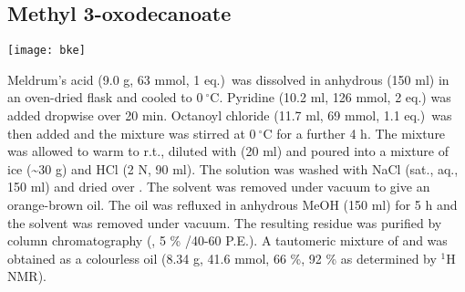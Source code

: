 \newpage

\subsection{Methyl 3-oxodecanoate }

\begin{scheme}[H]
	\begin{center}
		\texttt{[image: bke]}
	\end{center}
\end{scheme}

Meldrum's acid  (9.0 g, 63 mmol, 1 eq.)\ was dissolved in anhydrous  (150 ml) in an oven-dried flask and cooled to $0\ ^{\circ}$C. Pyridine (10.2 ml, 126 mmol, 2 eq.) was added dropwise over 20 min. Octanoyl chloride  (11.7 ml, 69 mmol, 1.1 eq.)\ was then added and the mixture was stirred at $0\ ^{\circ}$C for a further 4 h. 
The mixture was allowed to warm to r.t., diluted with  (20 ml) and poured into a mixture of ice (\textasciitilde 30 g) and HCl (2 N, 90 ml). The solution was washed with NaCl (sat., aq., 150 ml) and dried over . The solvent was removed under vacuum to give an orange-brown oil.
The oil was refluxed in anhydrous MeOH (150 ml) for 5 h and the solvent was removed under vacuum. The resulting residue was purified by column chromatography (, 5 \% /40-60 P.E.). A tautomeric mixture of  and  was obtained as a colourless oil (8.34 g, 41.6 mmol, 66 \%, 92 \%  as determined by $^{1}$H NMR).

